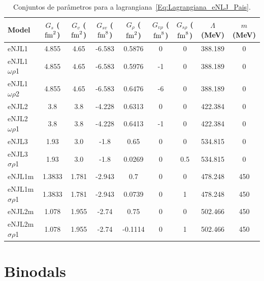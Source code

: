 \documentclass[prc, reprint, amsmath, floatfix,10pt]{revtex4-1}
\begin{document}
\begin{table}
\caption{Conjuntos de parâmetros para a lagrangiana~\eqref{Eq:Lagrangiana_eNLJ_Pais}\cite{Pais2016}. \label{Tab:Parametros_eNJL}}
\begin{ruledtabular}
\begin{tabular}{lcccccccc}
Model & $G_s$ ($\rm{fm}^2$) & $G_v$ ($\rm{fm}^2$) & $G_{sv}$ ($\rm{fm}^8$) & $G_\rho$ ($\rm{fm}^2$) & $G_{v\rho}$ ($\rm{fm}^8$) & $G_{s\rho}$ ($\rm{fm}^8$) & $\Lambda$ (MeV) & $m$ (MeV) \\
\hline
eNJL1 & 4.855 & 4.65 & -6.583 & 0.5876 & 0 & 0 & 388.189 & 0 \\
eNJL1$\omega\rho$1 & 4.855 & 4.65 & -6.583 & 0.5976 & -1 & 0 & 388.189 & 0 \\
eNJL1$\omega\rho$2 & 4.855 & 4.65 & -6.583 & 0.6476 & -6 & 0 & 388.189 & 0 \\
eNJL2 & 3.8 & 3.8 & -4.228 & 0.6313 & 0 & 0 & 422.384 & 0 \\
eNJL2$\omega\rho$1 & 3.8 & 3.8 & -4.228 & 0.6413 & -1 & 0 & 422.384 & 0 \\
eNJL3 & 1.93 & 3.0 & -1.8 & 0.65 & 0 & 0 & 534.815 & 0 \\
eNJL3$\sigma\rho$1 & 1.93 & 3.0 & -1.8 & 0.0269 & 0 & 0.5 & 534.815 & 0 \\
eNJL1m & 1.3833 & 1.781 & -2.943 & 0.7 & 0 & 0 & 478.248 & 450 \\
eNJL1m$\sigma\rho$1 & 1.3833 & 1.781 & -2.943 & 0.0739 & 0 & 1 & 478.248 & 450 \\
eNJL2m & 1.078 & 1.955 & -2.74 & 0.75 & 0 & 0 & 502.466 & 450 \\
eNJL2m$\sigma\rho$1 & 1.078 & 1.955 & -2.74 & -0.1114 & 0 & 1 & 502.466 & 450 \\
\end{tabular}
\end{ruledtabular}
\end{table}

\section{Binodals}
\end{document}

